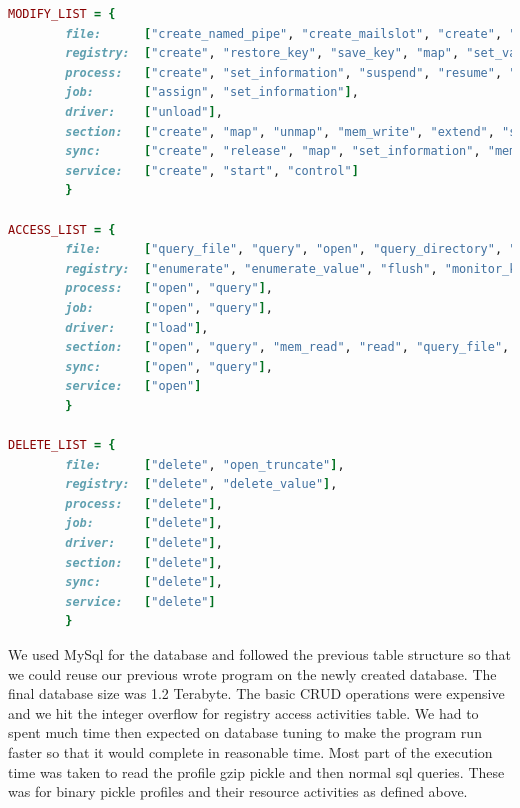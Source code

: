 \begin{lstlisting}[language=ruby,caption={Mapping of WinodowsNT and Windows API call},label={lbl:ntapi}]
MODIFY_LIST = {
        file:      ["create_named_pipe", "create_mailslot", "create", "rename", "lock", "set_information", "write", "unlock", "flush_buffer", "suspend", "map", "resume"],
        registry:  ["create", "restore_key", "save_key", "map", "set_value", "set_information", "compress_key", "lock", "resume", "suspend", "mem_write"],
        process:   ["create", "set_information", "suspend", "resume", "unmap", "map"],
        job:       ["assign", "set_information"],
        driver:    ["unload"],
        section:   ["create", "map", "unmap", "mem_write", "extend", "suspend", "resume", "set_information", "release"],
        sync:      ["create", "release", "map", "set_information", "mem_write"],
        service:   ["create", "start", "control"]
        }

ACCESS_LIST = {
        file:      ["query_file", "query", "open", "query_directory", "query_information", "read", "monitor_dir", "control", "device_control", "fs_control", "query_value"],
        registry:  ["enumerate", "enumerate_value", "flush", "monitor_key", "open", "query", "query_value", "mem_read"],
        process:   ["open", "query"],
        job:       ["open", "query"],
        driver:    ["load"],
        section:   ["open", "query", "mem_read", "read", "query_file", "query_system"],
        sync:      ["open", "query"],
        service:   ["open"]
        }

DELETE_LIST = {
        file:      ["delete", "open_truncate"],
        registry:  ["delete", "delete_value"],
        process:   ["delete"],
        job:       ["delete"],
        driver:    ["delete"],
        section:   ["delete"],
        sync:      ["delete"],
        service:   ["delete"]
        }

\end{lstlisting}
We used MySql for the database and followed the previous table structure so that we could reuse our previous wrote program on the newly created database.
The final database size was 1.2 Terabyte. The basic CRUD operations were expensive and we hit the integer overflow for registry access activities table. We had to spent much time then expected on database tuning to make the program run faster so that it would complete in reasonable time.
Most part of the execution time was taken to read the profile gzip pickle and then normal sql queries. These was for \gettotalmalwareii{} binary pickle profiles and their resource activities as defined above.\\
